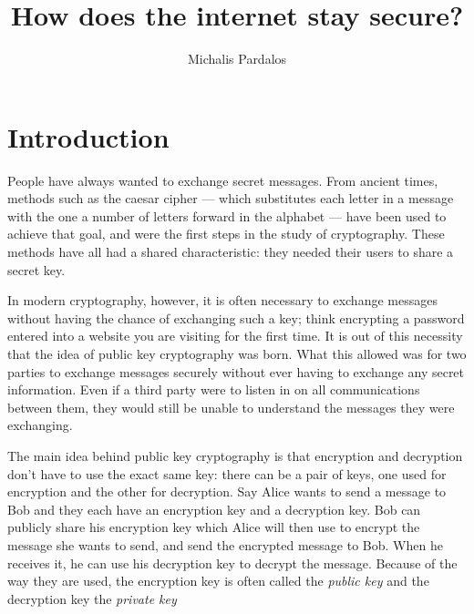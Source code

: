 \documentclass[12pt, titlepage]{article}
\title{How does the internet stay secure?}
\author{Michalis Pardalos}
\date{}
\begin{document}
\maketitle

\tableofcontents
\newpage

\section{Introduction}
    People have always wanted to exchange secret messages. From ancient times, methods such
    as the caesar cipher --- which substitutes each letter in a message with the one a
    number of letters forward in the alphabet --- have been used to achieve that goal, and
    were the first steps in the study of cryptography. These methods have all had a shared
    characteristic: they needed their users to share a secret key.

    In modern cryptography, however, it is often necessary to exchange messages without
    having the chance of exchanging such a key; think encrypting a password entered into a
    website you are visiting for the first time. It is out of this necessity that the idea
    of public key cryptography was born. What this allowed was for two parties to exchange
    messages securely without ever having to exchange any secret information. Even if a
    third party were to listen in on all communications between them, they would still be
    unable to understand the messages they were exchanging.

    The main idea behind public key cryptography is that encryption and decryption don't
    have to use the exact same key: there can be a pair of keys, one used for encryption and
    the other for decryption. Say Alice wants to send a message to Bob and they each have an
    encryption key and a decryption key. Bob can publicly share his encryption key which
    Alice will then use to encrypt the message she wants to send, and send the encrypted
    message to Bob. When he receives it, he can use his decryption key to decrypt the
    message. Because of the way they are used, the encryption key is often called the
    \emph{public key} and the decryption key the \emph{private key}
\end{document}
